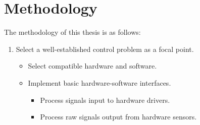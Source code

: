 \documentclass[crop=false,float=true,class=scrreprt]{standalone}
\begin{document}
\section{Methodology}

The methodology of this thesis is as follows:

\begin{enumerate}[leftmargin=*]

\item Select a well-established control problem as a focal point.
\\[-2.0em]
\begin{itemize}[leftmargin=*]

  \item Select compatible hardware and software.
  
  \item Implement basic hardware-software interfaces.
  \begin{itemize}[leftmargin=*, label=$\vcenter{\hbox{\tiny$\bullet$}}$]
    
    \item Process signals input to hardware drivers.
    \item Process raw signals output from hardware sensors.\\[-5.5em]
    \\[-1.0em]
      

\end{itemize}
\end{itemize}
\end{enumerate}
\end{document}
